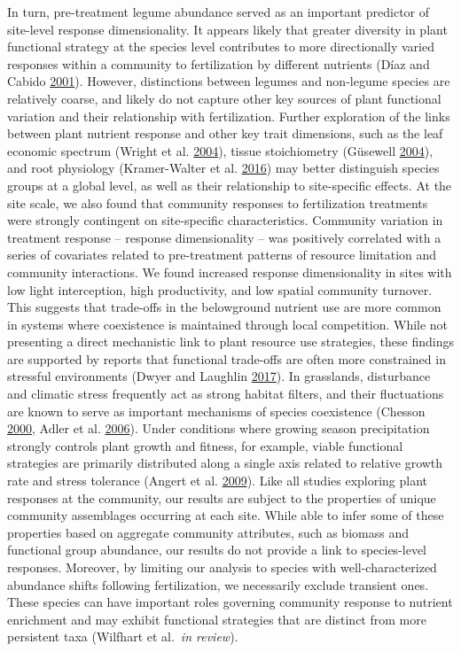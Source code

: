 \documentclass[twoside,12pt,final]{ucthesis-CA2012}
\begin{document}
\begin{ucmainmatter}
In turn, pre-treatment legume abundance served as an important predictor of site-level response dimensionality. It appears likely that greater diversity in plant functional strategy at the species level contributes to more directionally varied responses within a community to fertilization by different nutrients (Díaz and Cabido \protect\hyperlink{ref-Diaz2001}{2001}). However, distinctions between legumes and non-legume species are relatively coarse, and likely do not capture other key sources of plant functional variation and their relationship with fertilization. Further exploration of the links between plant nutrient response and other key trait dimensions, such as the leaf economic spectrum (Wright et al. \protect\hyperlink{ref-Wright2004}{2004}), tissue stoichiometry (Güsewell \protect\hyperlink{ref-Gusewell2004}{2004}), and root physiology (Kramer-Walter et al. \protect\hyperlink{ref-Kramer-Walter2016}{2016}) may better distinguish species groups at a global level, as well as their relationship to site-specific effects.
At the site scale, we also found that community responses to fertilization treatments were strongly contingent on site-specific characteristics. Community variation in treatment response -- response dimensionality -- was positively correlated with a series of covariates related to pre-treatment patterns of resource limitation and community interactions. We found increased response dimensionality in sites with low light interception, high productivity, and low spatial community turnover. This suggests that trade-offs in the belowground nutrient use are more common in systems where coexistence is maintained through local competition. While not presenting a direct mechanistic link to plant resource use strategies, these findings are supported by reports that functional trade-offs are often more constrained in stressful environments (Dwyer and Laughlin \protect\hyperlink{ref-Dwyer2017}{2017}). In grasslands, disturbance and climatic stress frequently act as strong habitat filters, and their fluctuations are known to serve as important mechanisms of species coexistence (Chesson \protect\hyperlink{ref-Chesson2000}{2000}, Adler et al. \protect\hyperlink{ref-Adler2006}{2006}). Under conditions where growing season precipitation strongly controls plant growth and fitness, for example, viable functional strategies are primarily distributed along a single axis related to relative growth rate and stress tolerance (Angert et al. \protect\hyperlink{ref-Angert2009}{2009}).
Like all studies exploring plant responses at the community, our results are subject to the properties of unique community assemblages occurring at each site. While able to infer some of these properties based on aggregate community attributes, such as biomass and functional group abundance, our results do not provide a link to species-level responses. Moreover, by limiting our analysis to species with well-characterized abundance shifts following fertilization, we necessarily exclude transient ones. These species can have important roles governing community response to nutrient enrichment and may exhibit functional strategies that are distinct from more persistent taxa (Wilfhart et al.~\emph{in review}).

\end{ucmainmatter}
\end{document}
